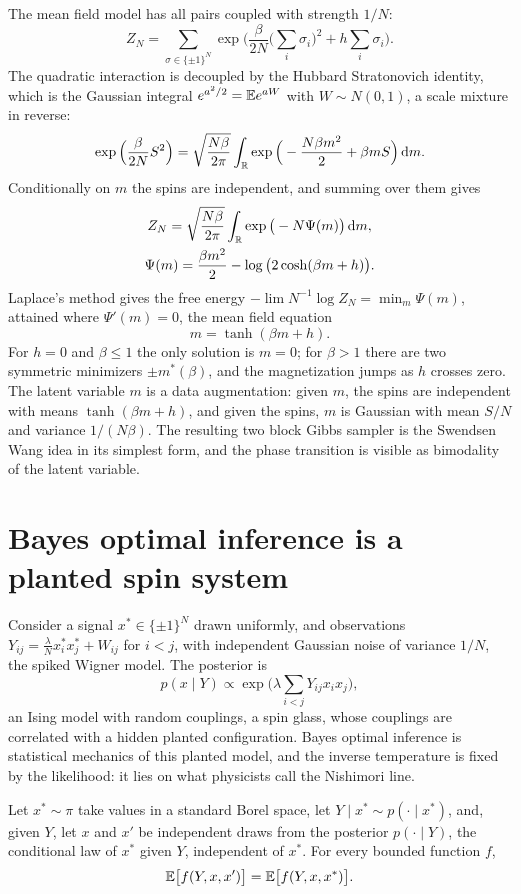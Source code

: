 The mean field model has all pairs coupled with strength $1/N$:
\[
Z_N = \sum_{\sigma\in\{\pm1\}^N}\exp\Big(\frac{\beta}{2N}\Big(\sum_i\sigma_i\Big)^2+h\sum_i\sigma_i\Big).
\]
The quadratic interaction is decoupled by the Hubbard Stratonovich identity, which is the Gaussian integral $e^{a^2/2} = \mathbb{E} e^{aW}$ with $W\sim N(0,1)$, a scale mixture in reverse:
\[
\exp\Big(\frac{\beta}{2N}S^2\Big) = \sqrt{\frac{N\beta}{2\pi}}\int_{\mathbb{R}}\exp\Big(-\frac{N\beta m^2}{2}+\beta mS\Big)\,\mathrm{d} m.
\]
Conditionally on $m$ the spins are independent, and summing over them gives
\begin{gather*}
Z_N = \sqrt{\frac{N\beta}{2\pi}}\int_{\mathbb{R}}\exp\big(-N\Psi(m)\big)\,\mathrm{d} m, \\
\Psi(m) = \frac{\beta m^2}{2}-\log\big(2\cosh(\beta m+h)\big).
\end{gather*}
Laplace's method gives the free energy $-\lim N^{-1}\log Z_N = \min_m\Psi(m)$, attained where $\Psi'(m) = 0$, the mean field equation
\[
m = \tanh(\beta m+h).
\]
For $h = 0$ and $\beta\leq1$ the only solution is $m = 0$; for $\beta>1$ there are two symmetric minimizers $\pm m^*(\beta)$, and the magnetization jumps as $h$ crosses zero. The latent variable $m$ is a data augmentation: given $m$, the spins are independent with means $\tanh(\beta m+h)$, and given the spins, $m$ is Gaussian with mean $S/N$ and variance $1/(N\beta)$. The resulting two block Gibbs sampler is the Swendsen Wang idea in its simplest form, and the phase transition is visible as bimodality of the latent variable.

\section{Bayes optimal inference is a planted spin system}\label{sec:spiked}

Consider a signal $x^*\in\{\pm1\}^N$ drawn uniformly, and observations $Y_{ij} = \frac{\lambda}{N}x^*_ix^*_j+W_{ij}$ for $i<j$, with independent Gaussian noise of variance $1/N$, the spiked Wigner model. The posterior is
\[
p(x\mid Y)\propto\exp\Big(\lambda\sum_{i<j}Y_{ij}x_ix_j\Big),
\]
an Ising model with random couplings, a spin glass, whose couplings are correlated with a hidden planted configuration. Bayes optimal inference is statistical mechanics of this planted model, and the inverse temperature is fixed by the likelihood: it lies on what physicists call the Nishimori line.

\begin{theorem}
Let $x^*\sim\pi$ take values in a standard Borel space, let $Y\mid x^*\sim p(\cdot\mid x^*)$, and, given $Y$, let $x$ and $x'$ be independent draws from the posterior $p(\cdot\mid Y)$, the conditional law of $x^*$ given $Y$, independent of $x^*$. For every bounded function $f$,
\[
\mathbb{E}\big[f(Y,x,x')\big] = \mathbb{E}\big[f(Y,x,x^*)\big].
\]
\end{theorem}

